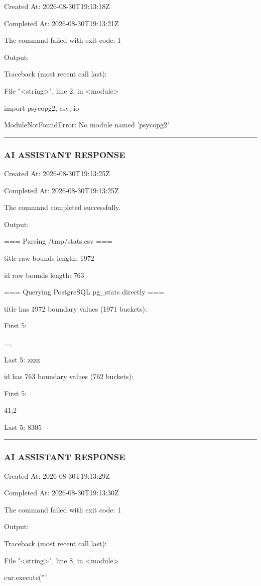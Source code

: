 \documentclass[11pt,a4paper]{article}
\begin{document}
{Created At: 2026-08-30T19:13:18Z

Completed At: 2026-08-30T19:13:21Z


The command failed with exit code: 1

Output:

Traceback (most recent call last):

File "<string>", line 2, in <module>

import psycopg2, csv, io

ModuleNotFoundError: No module named 'psycopg2'


\hrule

\subsubsection{AI ASSISTANT RESPONSE}

Created At: 2026-08-30T19:13:25Z

Completed At: 2026-08-30T19:13:25Z


The command completed successfully.

Output:

=== Parsing /tmp/stats.csv ===

title raw bounds length: 1972

id raw bounds length: 763


=== Querying PostgreSQL pg\_stats directly ===

title has 1972 boundary values (1971 buckets):

First 5: {...,

Last 5: zzzz}


id has 763 boundary values (762 buckets):

First 5: {41,2

Last 5: 8305}


\hrule

\subsubsection{AI ASSISTANT RESPONSE}

Created At: 2026-08-30T19:13:29Z

Completed At: 2026-08-30T19:13:30Z


The command failed with exit code: 1

Output:

Traceback (most recent call last):

File "<string>", line 8, in <module>

cur.execute('''

}
\end{document}
